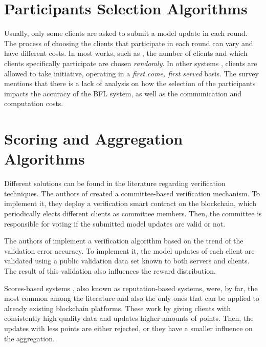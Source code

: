 \section{Participants Selection Algorithms}\label{related_work:participants_selection}

Usually, only some clients are asked to submit a model update in each round. The process of choosing the clients that participate in each round can vary and have different costs. In most works, such as \cite{Peyvandi2022, demo, 9293091}, the number of clients and which clients specifically participate are chosen \textit{randomly}. In other systems \cite{9184854, FANG20221}, clients are allowed to take initiative, operating in a \textit{first come, first served} basis. The survey \cite{9403374} mentions that there is a lack of analysis on how the selection of the participants impacts the accuracy of the BFL system, as well as the communication and computation costs.

\section{Scoring and Aggregation Algorithms}\label{related_work:scoring_techniques}

Different solutions can be found in the literature regarding verification techniques. The authors of \cite{9159643} created a committee-based verification mechanism. To implement it, they deploy a verification smart contract on the blockchain, which periodically elects different clients as committee members. Then, the committee is responsible for voting if the submitted model updates are valid or not.

The authors of \cite{8945913} implement a verification algorithm based on the trend of the validation error accuracy. To implement it, the model updates of each client are validated using a public validation data set known to both servers and clients. The result of this validation also influences the reward distribution.

Scores-based systems \cite{10.48550/arxiv.2011.07516, 9170559, Peyvandi2022, 9292450}, also known as reputation-based systems, were, by far, the most common among the literature and also the only ones that can be applied to already existing blockchain platforms. These work by giving clients with consistently high quality data and updates higher amounts of points. Then, the updates with less points are either rejected, or they have a smaller influence on the aggregation.

